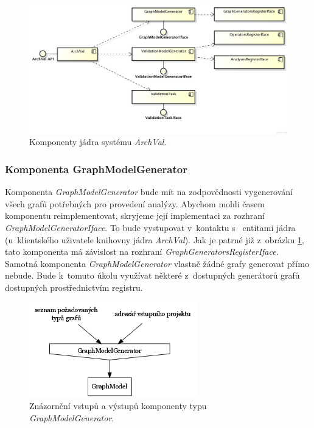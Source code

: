\begin{figure}[h!]
  \centering
  \includegraphics[width=1.0\textwidth]{./uml/archval_core_cmp.png}
  \caption{Komponenty jádra systému \emph{ArchVal}.\label{design-archval_core}}
\end{figure}

\subsubsection{Komponenta GraphModelGenerator}
Komponenta \emph{GraphModelGenerator} bude mít na zodpovědnosti vygenerování všech grafů potřebných pro provedení analýzy. Abychom mohli časem komponentu reimplementovat, skryjeme její implementaci za rozhraní \emph{GraphModelGeneratorIface}. To bude vystupovat v~kontaktu s~ entitami jádra (u~klientského uživatele knihovny jádra \emph{ArchVal}). Jak je patrné již z~obrázku \ref{design-archval_core}, tato komponenta má závislost na rozhraní \emph{GraphGeneratorsRegisterIface}. Samotná komponenta \emph{GraphModelGenerator} vlastně žádné grafy generovat přímo nebude. Bude k~tomuto úkolu využívat některé z~dostupných generátorů grafů dostupných prostřednictvím registru.

\begin{figure}[h!]
  \centering
  \includegraphics[width=0.65\textwidth]{./graphs/graph_generator_io_graph.png}
  \caption{Znázornění vstupů a výstupů komponenty typu \emph{GraphModelGenerator}.\label{design-graph_generator_io}}
\end{figure}

